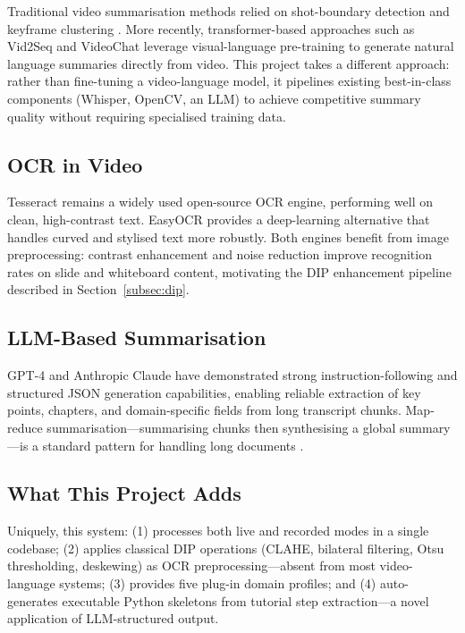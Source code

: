 \documentclass[12pt,a4paper]{article}
\begin{document}
Traditional video summarisation methods relied on shot-boundary detection and
keyframe clustering \cite{videosum_survey}. More recently, transformer-based approaches
such as Vid2Seq \cite{vid2seq} and VideoChat \cite{videochat} leverage visual-language
pre-training to generate natural language summaries directly from video. This project
takes a different approach: rather than fine-tuning a video-language model, it
pipelines existing best-in-class components (Whisper, OpenCV, an LLM) to achieve
competitive summary quality without requiring specialised training data.

\subsection{OCR in Video}

Tesseract \cite{tesseract2007} remains a widely used open-source OCR engine, performing
well on clean, high-contrast text. EasyOCR \cite{easyocr} provides a deep-learning
alternative that handles curved and stylised text more robustly. Both engines benefit
from image preprocessing: contrast enhancement and noise reduction improve recognition
rates on slide and whiteboard content, motivating the DIP enhancement pipeline described
in Section~\ref{subsec:dip}.

\subsection{LLM-Based Summarisation}

GPT-4 \cite{openai2023gpt4} and Anthropic Claude \cite{claude2024} have demonstrated
strong instruction-following and structured JSON generation capabilities, enabling
reliable extraction of key points, chapters, and domain-specific fields from long
transcript chunks. Map-reduce summarisation—summarising chunks then synthesising a
global summary—is a standard pattern for handling long documents \cite{langchain_mapreduce}.

\subsection{What This Project Adds}

Uniquely, this system: (1) processes both live and recorded modes in a single codebase;
(2) applies classical DIP operations (CLAHE, bilateral filtering, Otsu thresholding,
deskewing) as OCR preprocessing—absent from most video-language systems; (3) provides
five plug-in domain profiles; and (4) auto-generates executable Python skeletons from
tutorial step extraction—a novel application of LLM-structured output.
\end{document}
